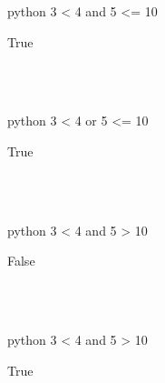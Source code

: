 \documentclass[aspectratio=1610,t]{beamer}
\begin{document}
\begin{pframe}
 \begin{ipython}
  \begin{pythonin}{python}
3 < 4 and 5 <= 10
  \end{pythonin}
  \begin{pythonout}
True
  \end{pythonout} \\ \\
  \begin{pythonin}{python}
3 < 4 or 5 <= 10
  \end{pythonin}
  \begin{pythonout}
True
  \end{pythonout} \\ \\
  \begin{pythonin}{python}
3 < 4 and 5 > 10
  \end{pythonin}
  \begin{pythonout}
False
  \end{pythonout}
 \\ \\
  \begin{pythonin}{python}
3 < 4 and 5 > 10
  \end{pythonin}
  \begin{pythonout}
True
  \end{pythonout}
 \end{ipython}
\end{pframe}
\end{document}
